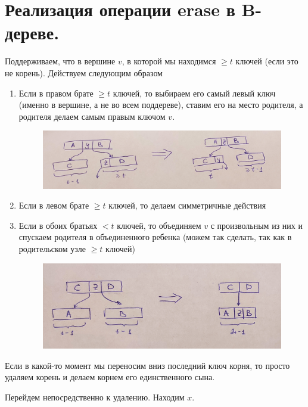 \setcounter{section}{53}
\section{Реализация операции erase в B-дереве.}
\par Поддерживаем, что в вершине $v$, в которой мы находимся $\geqslant t$ ключей (если это не корень). Действуем следующим образом \begin{enumerate}
    \item Если в правом брате $\geqslant t$ ключей, то выбираем его самый левый ключ (именно в вершине, а не во всем поддереве), ставим его на место родителя, а родителя делаем самым правым ключом $v$.
    \begin{figure}[h]
        \centering
        \includegraphics[scale=0.15]{images/51-54_b brothers.jpg}
    \end{figure}
    \item Если в левом брате $\geqslant t$ ключей, то делаем симметричные действия
    \item Если в обоих братьях $< t$ ключей, то объединяем $v$ с произвольным из них и спускаем родителя в объединенного ребенка (можем так сделать, так как в родительском узле $\geqslant t$ ключей)
    \begin{figure}[h]
        \centering
        \includegraphics[scale=0.15]{images/51-54_b union.jpg}
    \end{figure}
\end{enumerate}
\par Если в какой-то момент мы переносим вниз последний ключ корня, то просто удаляем корень и делаем корнем его единственного сына.
\par Перейдем непосредственно к удалению. Находим $x$. 
